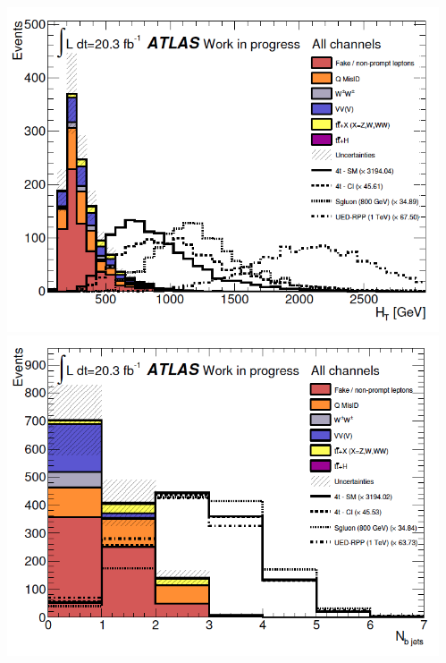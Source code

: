 \begin{frame}
\begin{columns}
\begin{column}{0.65\textwidth}
\end{column}
\begin{column}{0.35\textwidth}

\begin{center}
\hspace*{-0.5cm}
\includegraphics[width=1.2\textwidth]{Figures/FourTops/HTDistrib4topSignals.png}\\
\hspace*{-0.5cm}
\includegraphics[width=1.2\textwidth]{Figures/FourTops/NbJetsDistrib4topSignals.png}
\end{center}

\end{column}
\end{columns}
\end{frame}

